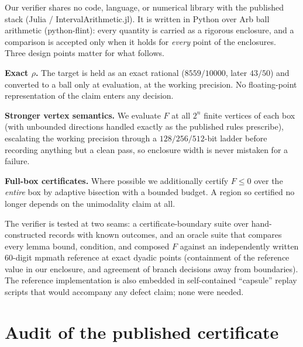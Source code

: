 \documentclass[11pt]{article}
\newcommand{\rr}{\rho}
\begin{document}
Our verifier shares no code, language, or numerical library with the
published stack (Julia / IntervalArithmetic.jl). It is written in Python
over Arb \cite{Arb17} ball arithmetic (python-flint): every quantity is
carried as a rigorous enclosure, and a comparison is accepted only when
it holds for \emph{every} point of the enclosures. Three design points
matter for what follows.

\textbf{Exact $\rr$.} The target is held as an exact rational
($8559/10000$, later $43/50$) and converted to a ball only at evaluation,
at the working precision. No floating-point representation of the claim
enters any decision.

\textbf{Stronger vertex semantics.} We evaluate $F$ at all $2^n$ finite
vertices of each box (with unbounded directions handled exactly as the
published rules prescribe), escalating the working precision through a
$128/256/512$-bit ladder before recording anything but a clean pass, so
enclosure width is never mistaken for a failure.

\textbf{Full-box certificates.} Where possible we additionally certify
$F \le 0$ over the \emph{entire} box by adaptive bisection with a bounded
budget. A region so certified no longer depends on the unimodality claim
at all.

The verifier is tested at two seams: a certificate-boundary suite over
hand-constructed records with known outcomes, and an oracle suite that
compares every lemma bound, condition, and composed $F$ against an
independently written 60-digit mpmath reference at exact dyadic points
(containment of the reference value in our enclosure, and agreement of
branch decisions away from boundaries). The reference implementation is
also embedded in self-contained ``capsule'' replay scripts that would
accompany any defect claim; none were needed.

\section{Audit of the published certificate}\label{sec:audit}
\end{document}
